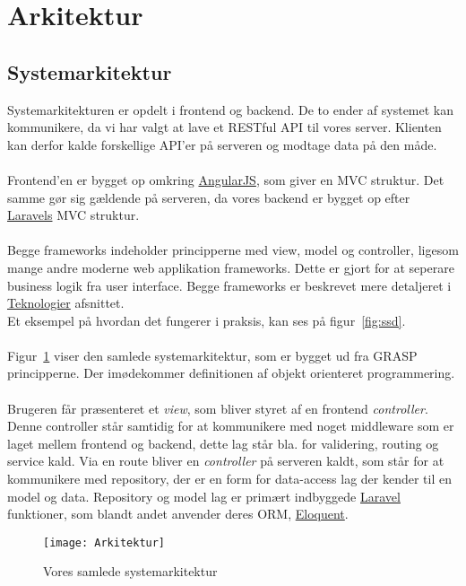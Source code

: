 \section{Arkitektur}
\subsection{Systemarkitektur}
Systemarkitekturen er opdelt i frontend og backend.
De to ender af systemet kan kommunikere, da vi har valgt at lave et RESTful API til vores server.
Klienten kan derfor kalde forskellige API'er på serveren og modtage data på den måde.
\\\\
Frontend'en er bygget op omkring \hyperlink{AngularJS}{AngularJS}, som giver en MVC struktur.
Det samme gør sig gældende på serveren, da vores backend er bygget op efter \hyperlink{Laravel}{Laravels} MVC struktur.
\\\\
Begge frameworks indeholder principperne med view, model og controller, ligesom mange andre moderne web applikation frameworks.
Dette er gjort for at seperare business logik fra user interface. Begge frameworks er beskrevet mere detaljeret i \hyperlink{Teknologier}{Teknologier} afsnittet.
\\
Et eksempel på hvordan det fungerer i praksis, kan ses på figur~\ref{fig:ssd}.
\\\\
Figur~\ref{fig:arkitektur} viser den samlede systemarkitektur, som er bygget ud fra GRASP principperne. Der imødekommer definitionen af objekt orienteret programmering.
\\\\
Brugeren får præsenteret et \textit{view}, som bliver styret af en frontend \textit{controller}. Denne controller står samtidig for at kommunikere med noget middleware som er laget mellem frontend og backend, dette lag står bla. for validering, routing og service kald. Via en route bliver en \textit{controller} på serveren kaldt, som står for at kommunikere med repository, der er en form for data-access lag der kender til en model og data. Repository og model lag er primært indbyggede \hyperlink{Laravel}{Laravel} funktioner, som blandt andet anvender deres ORM, \href{http://laravel.com/docs/5.1/eloquent}{Eloquent}.
\begin{figure}[H]
\texttt{[image: Arkitektur]}
\caption{Vores samlede systemarkitektur}
\label{fig:arkitektur}
\end{figure}
